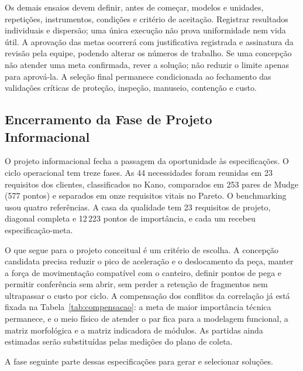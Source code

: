 Os demais ensaios devem definir, antes de começar, modelos e unidades, repetições, instrumentos, condições e critério de aceitação. Registrar resultados individuais e dispersão; uma única execução não prova uniformidade nem vida útil. A aprovação das metas ocorrerá com justificativa registrada e assinatura da revisão pela equipe, podendo alterar os números de trabalho. Se uma concepção não atender uma meta confirmada, rever a solução; não reduzir o limite apenas para aprová-la. A seleção final permanece condicionada ao fechamento das validações críticas de proteção, inspeção, manuseio, contenção e custo.


\subsection{Encerramento da Fase de Projeto Informacional}

O projeto informacional fecha a passagem da oportunidade às especificações. O ciclo operacional tem treze fases. As 44 necessidades foram reunidas em 23 requisitos dos clientes, classificados no Kano, comparados em 253 pares de Mudge (577 pontos) e separados em onze requisitos vitais no Pareto. O benchmarking usou quatro referências. A casa da qualidade tem 23 requisitos de projeto, diagonal completa e 12\,223 pontos de importância, e cada um recebeu especificação-meta.

O que segue para o projeto conceitual é um critério de escolha. A concepção candidata precisa reduzir o pico de aceleração e o deslocamento da peça, manter a força de movimentação compatível com o canteiro, definir pontos de pega e permitir conferência sem abrir, sem perder a retenção de fragmentos nem ultrapassar o custo por ciclo. A compensação dos conflitos da correlação já está fixada na Tabela~\ref{tab:compensacao}: a meta de maior importância técnica permanece, e o meio físico de atender o par fica para a modelagem funcional, a matriz morfológica e a matriz indicadora de módulos. As partidas ainda estimadas serão substituídas pelas medições do plano de coleta.

A fase seguinte parte dessas especificações para gerar e selecionar soluções.
